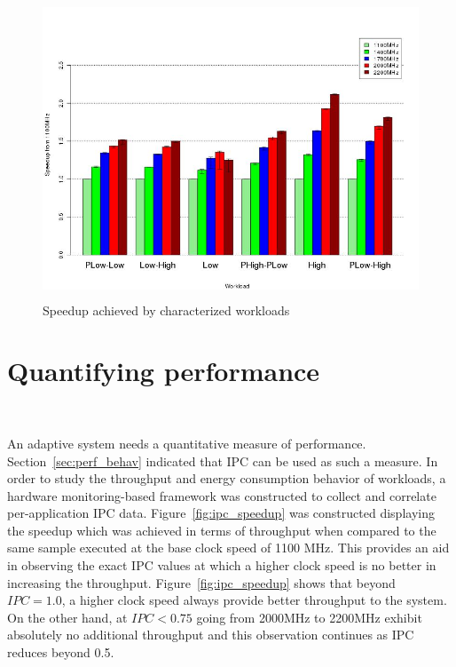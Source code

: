 \begin{figure}[h!]
  \begin{center}
    \includegraphics[height=3.5in]{figures/group_speedup.jpg}%
    \caption{Speedup achieved by characterized workloads}
    \label{fig:group_speedup}
  \end{center}
\end{figure}

\section{Quantifying performance}~\label{sec:quant_perf}

An adaptive system needs a quantitative measure of performance. Section~\ref{sec:perf_behav} indicated
that IPC can be used as such a measure. In order to study the throughput and energy consumption behavior of
workloads, a hardware monitoring-based framework was constructed to
collect and correlate per-application IPC data. Figure~\ref{fig:ipc_speedup} 
was constructed displaying the speedup which was achieved in terms of throughput when compared to the same 
sample executed at the base clock speed of 1100 MHz. This provides an aid in observing the exact IPC
values at which a higher clock speed is no better in increasing the throughput. Figure~\ref{fig:ipc_speedup}
shows that beyond $IPC = 1.0$, a higher clock speed always provide better throughput to the system. On the
other hand, at $IPC < 0.75$ going from 2000MHz to 2200MHz exhibit absolutely no additional throughput 
and this observation continues as IPC reduces beyond 0.5.

